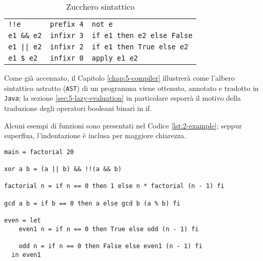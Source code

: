 \begin{table}[H]
\begin{center}
\begin{tabularx}{\textwidth}{|p{8em}@{\quad}p{7em}|X|}
            \texttt{!!e}                 & \texttt{prefix 4} & \texttt{not e}                    \\
            \texttt{e1 \&\& e2}          & \texttt{infixr 3} & \texttt{if e1 then e2 else False} \\
            \texttt{e1 || e2}            & \texttt{infixr 2} & \texttt{if e1 then True else e2}  \\
            \texttt{e1 \$ e2}            & \texttt{infixr 0} & \texttt{apply e1 e2}              \\
            \hline
        \end{tabularx}
    \end{center}
    \caption{Zucchero sintattico}
    \label{tab:2-sugar}
\end{table}

\newpage

\noindent Come già accennato, il Capitolo \ref{chap:5-compiler} illustrerà come l'albero sintattico astratto (\texttt{AST})
di un programma viene ottenuto, annotato e tradotto in \texttt{Java}; la sezione \ref{sec:5-lazy-evaluation}
in particolare esporrà il motivo della traduzione degli operatori booleani binari in if.

\noindent Alcuni esempi di funzioni sono presentati nel Codice \ref{lst:2-example};
seppur superflua, l'indentazione è inclusa per maggiore chiarezza.

\vspace{8mm}
\begin{lstlisting}[caption={Esempio di programma}, style=funxCode, label={lst:2-example}]
main = factorial 20

xor a b = (a || b) && !!(a && b)

factorial n = if n == 0 then 1 else n * factorial (n - 1) fi

gcd a b = if b == 0 then a else gcd b (a % b) fi

even = let
    even1 n = if n == 0 then True else odd (n - 1) fi

    odd n = if n == 0 then False else even1 (n - 1) fi
  in even1
\end{lstlisting}